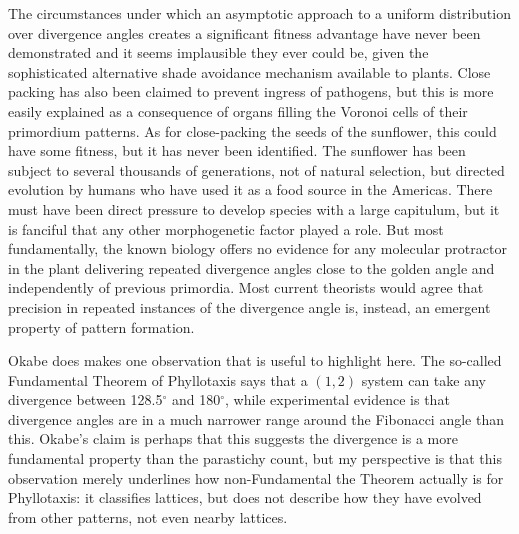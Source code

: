 The circumstances under which an asymptotic approach to a uniform distribution over divergence angles creates a significant fitness advantage have never been demonstrated and it seems implausible they ever could be, given the sophisticated alternative shade avoidance mechanism available to plants. Close packing has also been claimed to prevent ingress of pathogens, but this is more easily explained as a consequence of organs filling the Voronoi cells of their primordium patterns. As for close-packing the seeds of the sunflower, this could have some fitness, but it has never been identified. The sunflower has been subject to several thousands of generations, not of natural selection, but directed evolution by humans who have used it as a food source in the Americas. There must have been direct pressure to develop species with a large capitulum, but it is fanciful that any other morphogenetic factor played a role. 
But most fundamentally, the known biology offers no evidence for any molecular protractor in the plant delivering repeated divergence angles close to the golden angle and independently of previous primordia. Most current theorists would agree that precision in repeated instances of the divergence angle is, instead, an emergent property of pattern formation. 

Okabe does makes one observation that is useful to highlight here. The so-called Fundamental Theorem of Phyllotaxis says that a $(1,2)$ system can take any divergence between 128.5$^\circ$ and 180$^\circ$, while experimental evidence is that divergence angles are in a much narrower range around the Fibonacci angle than this. Okabe's claim is perhaps that this suggests the divergence is a more fundamental property than the parastichy count, but my perspective is that this observation merely underlines how non-Fundamental the Theorem actually is for Phyllotaxis: it classifies lattices, but does not describe how they have evolved from other patterns, not even nearby lattices.

